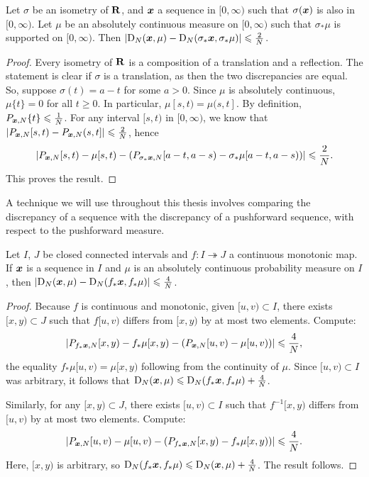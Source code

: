 \begin{lemma}\label{lem:flip-discrepancy}
Let $\sigma$ be an isometry of $\mathbf{R}$, and ${\boldsymbol x}$ a sequence in $[0,\infty)$ 
such that $\sigma({\boldsymbol x})$ is also in $[0,\infty)$. Let $\mu$ be an absolutely 
continuous measure on $[0,\infty)$ such that $\sigma_\ast \mu$ is supported on 
$[0,\infty)$. Then 
$\left|\operatorname{D}_N({\boldsymbol x}, \mu) - \operatorname{D}_N(\sigma_\ast {\boldsymbol x}, \sigma_\ast \mu)\right| \leqslant \frac{2}{N}$. 
\end{lemma}
\begin{proof}
Every isometry of $\mathbf{R}$ is a composition of a translation and a reflection. 
The statement is clear if $\sigma$ is a translation, as then the two 
discrepancies are equal. So, suppose $\sigma(t) = a - t$ for some $a>0$. Since 
$\mu$ is absolutely continuous, $\mu\{t\}=0$ for all $t\geqslant 0$. In 
particular, $\mu[s,t) = \mu(s,t]$. By definition, 
$P_{{\boldsymbol x},N}\{t\}\leqslant \frac 1 N$. For any interval $[s,t)$ in $[0,\infty)$, 
we know that 
$\left| P_{{\boldsymbol x},N}[s,t) - P_{{\boldsymbol x},N}(s,t]\right| \leqslant \frac{2}{N}$, hence 
\[
	\left| P_{{\boldsymbol x},N}[s,t) - \mu[s,t) - \left(P_{\sigma_\ast {\boldsymbol x},N}[a-t,a-s) - \sigma_\ast \mu[a-t,a-s)\right)\right| \leqslant \frac{2}{N} .
\]
This proves the result. 
\end{proof}

A technique we will use throughout this thesis involves comparing the 
discrepancy of a sequence with the discrepancy of a pushforward sequence, 
with respect to the pushforward measure. 

\begin{lemma}\label{lem:push-discrepancy}
Let $I$, $J$ be closed connected intervals and $f\colon I\twoheadrightarrow J$ 
a continuous monotonic map. If ${\boldsymbol x}$ is a sequence in $I$ and $\mu$ is an 
absolutely continuous probability measure on $I$, then 
$\left|\operatorname{D}_N({\boldsymbol x},\mu) - \operatorname{D}_N(f_\ast {\boldsymbol x},f_\ast\mu)\right| \leqslant \frac 4 N$.
\end{lemma}
\begin{proof}
Because $f$ is continuous and monotonic, given $[u,v)\subset I$, there exists 
$[x,y)\subset J$ such that $f[u,v)$ differs from $[x,y)$ by at most two 
elements. Compute:
\[
	\left| P_{f_\ast{\boldsymbol x},N}[x,y) - f_\ast\mu[x,y) - \left(P_{{\boldsymbol x},N}[u,v) - \mu[u,v)\right)\right| \leqslant \frac 4 N ,
\]
the equality $f_\ast\mu[u,v) = \mu[x,y)$ following from the continuity of $\mu$. 
Since $[u,v)\subset I$ was arbitrary, it follows that 
$\operatorname{D}_N({\boldsymbol x},\mu) \leqslant \operatorname{D}_N(f_\ast {\boldsymbol x},f_\ast\mu) + \frac 4 N$. 

Similarly, for any $[x,y)\subset J$, there exists $[u,v)\subset I$ such that 
$f^{-1}[x,y)$ differs from $[u,v)$ by at most two elements. Compute:
\[
	\left| P_{{\boldsymbol x},N}[u,v) - \mu[u,v) - \left(P_{f_\ast {\boldsymbol x},N}[x,y) - f_\ast\mu[x,y)\right)\right| \leqslant \frac 4 N .
\]
Here, $[x,y)$ is arbitrary, so 
$\operatorname{D}_N(f_\ast {\boldsymbol x},f_\ast\mu) \leqslant \operatorname{D}_N({\boldsymbol x},\mu) + \frac 4 N$. The result 
follows. 
\end{proof}

